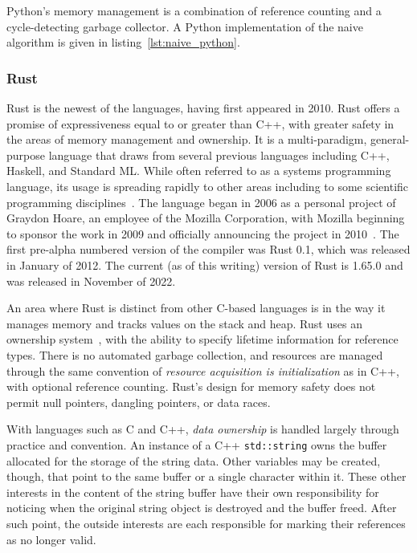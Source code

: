 Python's memory management is a combination of reference counting and a cycle-detecting garbage collector. A Python implementation of the naive algorithm is given in listing~\ref{lst:naive_python}.



\subsubsection{Rust}

Rust is the newest of the languages, having first appeared in 2010. Rust offers a promise of expressiveness equal to or greater than C++, with greater safety in the areas of memory management and ownership. It is a multi-paradigm, general-purpose language that draws from several previous languages including C++, Haskell, and Standard ML. While often referred to as a systems programming language, its usage is spreading rapidly to other areas including to some scientific programming disciplines~\cite{nature}. The language began in 2006 as a personal project of Graydon Hoare, an employee of the Mozilla Corporation, with Mozilla beginning to sponsor the work in 2009 and officially announcing the project in 2010~\cite{asay}. The first pre-alpha numbered version of the compiler was Rust 0.1, which was released in January of 2012. The current (as of this writing) version of Rust is 1.65.0 and was released in November of 2022.

An area where Rust is distinct from other C-based languages is in the way it manages memory and tracks values on the stack and heap. Rust uses an ownership system~\cite[Chapter~4]{programming}, with the ability to specify lifetime information for reference types. There is no automated garbage collection, and resources are managed through the same convention of \textit{resource acquisition is initialization} as in C++, with optional reference counting. Rust's design for memory safety does not permit null pointers, dangling pointers, or data races.

With languages such as C and C++, \textit{data ownership} is handled largely through practice and convention. An instance of a C++ \texttt{std::string} owns the buffer allocated for the storage of the string data. Other variables may be created, though, that point to the same buffer or a single character within it. These other interests in the content of the string buffer have their own responsibility for noticing when the original string object is destroyed and the buffer freed. After such point, the outside interests are each responsible for marking their references as no longer valid.

